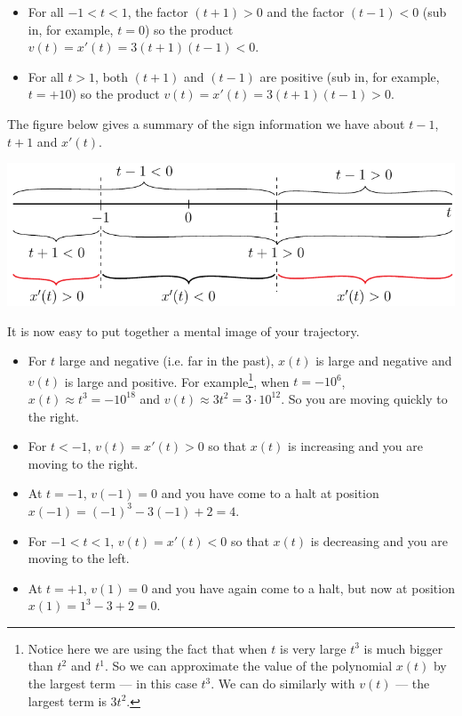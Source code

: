 \begin{eg}
\begin{itemize}
\item For all $-1<t<1$, the factor $(t+1)>0$ and the factor $(t-1)<0$
(sub in, for example, $t=0$) so the product $v(t)=x'(t)=3(t+1)(t-1)<0$.

\item For all $t>1$, both $(t+1)$ and $(t-1)$ are positive (sub in, for example,
$t=+10$) so the product $v(t)=x'(t)=3(t+1)(t-1)>0$.
\end{itemize}
The figure below gives a summary of the sign information we have about
$t-1$, $t+1$ and $x'(t)$.
\begin{efig}
\begin{center}
   \includegraphics{speedD}
\end{center}
\end{efig}
It is now easy to put together a mental image of your trajectory.
\begin{itemize}
\item For $t$ large and negative (i.e. far in the past), $x(t)$ is large
and negative and $v(t)$ is large and positive. For example\footnote{Notice here we are
using the fact that when $t$ is very large $t^3$ is much bigger than $t^2$ and $t^1$.
So we can approximate the value of the polynomial $x(t)$ by the largest term --- in
this case $t^3$. We can do similarly with $v(t)$ --- the largest term is $3t^2$.}, when
$t=-10^6$, $x(t)\approx t^3=- 10^{18}$ and $v(t)\approx  3t^2 = 3\cdot 10^{12}$.
So you are moving quickly to the right.

\item For $t<-1$, $v(t)=x'(t)>0$ so that $x(t)$ is increasing and you are moving
to the right.

\item At $t=-1$, $v(-1)=0$ and you have come to a halt at
position $x(-1)=(-1)^3-3(-1)+2=4$.

\item For $-1<t<1$, $v(t)=x'(t)<0$ so that $x(t)$ is decreasing and you are moving
to the left.

\item At $t=+1$, $v(1)=0$ and you have again come to a halt, but now at
position $x(1)=1^3-3+2=0$.


\end{itemize}
\end{eg}
